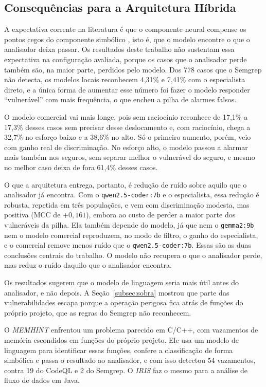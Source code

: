 \subsection{Consequências para a Arquitetura Híbrida}
\label{subsec:consequencias}

A expectativa corrente na literatura é que o componente neural compense os pontos cegos do componente simbólico \cite{li2025iris}, isto é, que o modelo encontre o que o analisador deixa passar. Os resultados deste trabalho não sustentam essa expectativa na configuração avaliada, porque os casos que o analisador perde também são, na maior parte, perdidos pelo modelo. Dos 778 casos que o Semgrep não detecta, os modelos locais reconhecem 4,31\% e 7,41\% com o especialista direto, e a única forma de aumentar esse número foi fazer o modelo responder ``vulnerável'' com mais frequência, o que encheu a pilha de alarmes falsos.

O modelo comercial vai mais longe, pois sem raciocínio reconhece de 17,1\% a 17,3\% desses casos sem precisar desse deslocamento e, com raciocínio, chega a 32,7\% no esforço baixo e a 38,6\% no alto. Só o primeiro aumento, porém, veio com ganho real de discriminação. No esforço alto, o modelo passou a alarmar mais também nos seguros, sem separar melhor o vulnerável do seguro, e mesmo no melhor caso deixa de fora 61,4\% desses casos.

O que a arquitetura entrega, portanto, é redução de ruído sobre aquilo que o analisador já encontra. Com o \texttt{qwen2.5-coder:7b} e o especialista, essa redução é robusta, repetida em três populações, e vem com discriminação modesta, mas positiva (MCC de $+0{,}161$), embora ao custo de perder a maior parte dos vulneráveis da pilha. Ela também depende do modelo, já que nem o \texttt{gemma2:9b} nem o modelo comercial reproduzem, no modo de filtro, o ganho do especialista, e o comercial remove menos ruído que o \texttt{qwen2.5-coder:7b}. Essas são as duas conclusões centrais do trabalho. O modelo não recupera o que o analisador perde, mas reduz o ruído daquilo que o analisador encontra.

Os resultados sugerem que o modelo de linguagem seria mais útil antes do analisador, e não depois. A Seção~\ref{subsec:sobra} mostrou que parte das vulnerabilidades escapa porque a operação perigosa fica atrás de funções do próprio projeto, que as regras do Semgrep não reconhecem.

O \textit{MEMHINT} \cite{huang2026memhint} enfrentou um problema parecido em C/C++, com vazamentos de memória escondidos em funções do próprio projeto. Ele usa um modelo de linguagem para identificar essas funções, confere a classificação de forma simbólica e passa o resultado ao analisador, e com isso detectou 54 vazamentos, contra 19 do CodeQL e 2 do Semgrep. O \textit{IRIS} \cite{li2025iris} faz o mesmo para a análise de fluxo de dados em Java.

